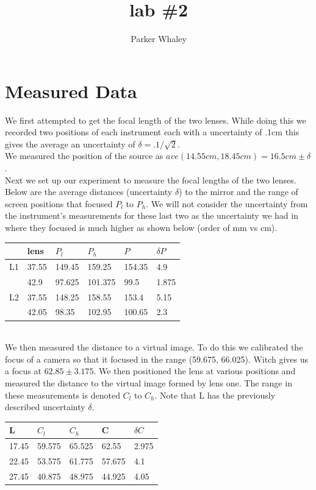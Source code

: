 \documentclass[12pt,a4paper]{article}
\author{Parker Whaley}
\title{lab \#2}
\begin{document}
\maketitle
\section{Measured Data}
We first attempted to get the focal length of the two lenses.  While doing this we recorded two positions of each instrument each with a uncertainty of .1cm this gives the average an uncertainty of $\delta=.1/\sqrt{2}$.\\

We measured the position of the source as $ave(14.55cm, 18.45cm)=16.5cm \pm \delta$.\\

Next we set up our experiment to measure the focal lengths of the two lenses.  Below are the average distances (uncertainty $\delta$) to the mirror and the range of screen positions that focused $P_l$ to $P_h$.  We will not consider the uncertainty from the instrument's measurements for these last two as the uncertainty we had in where they focused is much higher as shown below (order of mm vs cm).\\

\begin{tabular}{| l | l | l | l | l | l |}
\hline
 & lens & $P_l$ & $P_h$ & $P$ & $\delta P$\\
\hline
L1 & 37.55 & 149.45 & 159.25 & 154.35 & 4.9\\
\hline
 & 42.9 & 97.625 & 101.375 & 99.5 & 1.875\\
\hline
L2 & 37.55 & 148.25 & 158.55 & 153.4 & 5.15\\
\hline
& 42.05 & 98.35 & 102.95 & 100.65 & 2.3\\
\hline
\end{tabular}\\

We then measured the distance to a virtual image.  To do this we calibrated the focus of a camera so that it focused in the range (59.675, 66.025).  Witch gives us a focus at $62.85\pm3.175$.  We then positioned the lens at various positions and measured the distance to the virtual image formed by lens one.  The range in these measurements is denoted $C_l$ to $C_h$.  Note that L has the previously described uncertainty $\delta$.\\

\begin{tabular}{| l | l | l | l | l |}
\hline
L & $C_l$ & $C_h$ & C & $\delta C$\\
\hline
17.45 & 59.575 & 65.525 & 62.55 & 2.975\\
\hline
22.45 & 53.575 & 61.775 & 57.675 & 4.1\\
\hline
27.45 & 40.875 & 48.975 & 44.925 & 4.05\\
\hline
\end{tabular}\\
\end{document}
